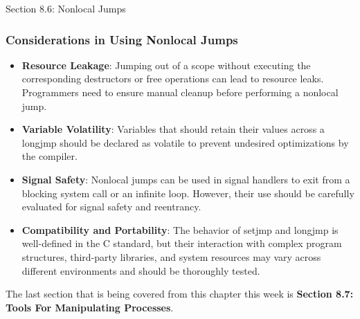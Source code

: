 \begin{notes}{Section 8.6: Nonlocal Jumps}
    \subsubsection*{Considerations in Using Nonlocal Jumps}
    
    \begin{itemize}
        \item \textbf{Resource Leakage}: Jumping out of a scope without executing the corresponding destructors or free operations can lead to resource leaks. Programmers need to ensure manual cleanup 
        before performing a nonlocal jump.
        \item \textbf{Variable Volatility}: Variables that should retain their values across a longjmp should be declared as volatile to prevent undesired optimizations by the compiler.
        \item \textbf{Signal Safety}: Nonlocal jumps can be used in signal handlers to exit from a blocking system call or an infinite loop. However, their use should be carefully evaluated for signal 
        safety and reentrancy.
        \item \textbf{Compatibility and Portability}: The behavior of setjmp and longjmp is well-defined in the C standard, but their interaction with complex program structures, third-party libraries, 
        and system resources may vary across different environments and should be thoroughly tested.
    \end{itemize}    
\end{notes}

The last section that is being covered from this chapter this week is \textbf{Section 8.7: Tools For Manipulating Processes}.


